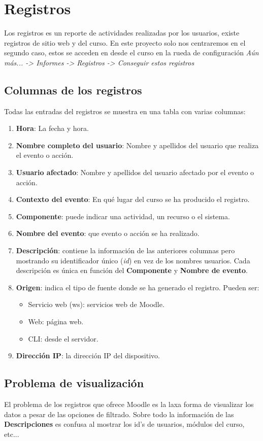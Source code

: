 
\section{Registros}
Los registros es un reporte de actividades realizadas por los usuarios, existe registros de sitio web y del curso. En este proyecto solo nos centraremos en el segundo caso, estos se acceden en desde el curso en la rueda de configuración \textit{Aún más... ->  Informes ->  Registros -> Conseguir estos registros}


\subsection{Columnas de los registros}
Todas las entradas del registros se muestra en una tabla con varias columnas: 
\begin{enumerate}
	\item \textbf{Hora}: La fecha y hora.
	\item \textbf{Nombre completo del usuario}: Nombre y apellidos del usuario que realiza el evento o acción.
	\item \textbf{Usuario afectado}: Nombre y apellidos del usuario afectado por el evento o acción.
	\item \textbf{Contexto del evento}: En qué lugar del curso se ha producido el registro.
	\item \textbf{Componente}: puede indicar una actividad, un recurso o el sistema.
	\item \textbf{Nombre del evento}: que evento o acción se ha realizado.
	\item \textbf{Descripción}: contiene la información de las anteriores columnas pero mostrando su identificador único (\textit{id}) en vez de los nombres usuarios. Cada descripción es única en función del \textbf{Componente} y \textbf{Nombre de evento}.
	\item \textbf{Origen}: indica el tipo de fuente donde se ha generado el registro. Pueden ser:
	\begin{itemize}
		\item Servicio web (ws): servicios web de Moodle.
		\item Web: página web.
		\item CLI: desde el servidor.
	\end{itemize}
	\item \textbf{Dirección IP}: la dirección IP del dispositivo.
	
\end{enumerate}

\subsection{Problema de visualización}

El problema de los registros que ofrece Moodle es la laxa forma de visualizar los datos a pesar de las opciones de filtrado. Sobre todo la información de las \textbf{Descripciones} es confusa al mostrar los id's de usuarios, módulos del curso, etc...




